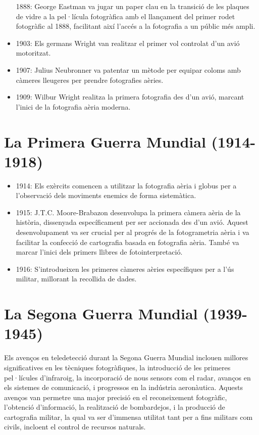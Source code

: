 \documentclass[
]{book}
\providecommand{\tightlist}{%
  \setlength{\itemsep}{0pt}\setlength{\parskip}{0pt}}
\begin{document}
\begin{itemize}
  1888: George Eastman va jugar un paper clau en la transició de les plaques de vidre a la pel·lícula fotogràfica amb el llançament del primer rodet fotogràfic al 1888, facilitant així l'accés a la fotografia a un públic més ampli.
\item
  1903: Els germans Wright van realitzar el primer vol controlat d'un avió motoritzat.
\item
  1907: Julius Neubronner va patentar un mètode per equipar coloms amb càmeres lleugeres per prendre fotografies aèries.
\item
  1909: Wilbur Wright realitza la primera fotografia des d'un avió, marcant l'inici de la fotografia aèria moderna.
\end{itemize}

\hypertarget{la-primera-guerra-mundial-1914-1918}{%
\section{La Primera Guerra Mundial (1914-1918)}\label{la-primera-guerra-mundial-1914-1918}}

\begin{itemize}
\tightlist
\item
  1914: Els exèrcits comencen a utilitzar la fotografia aèria i globus per a l'observació dels moviments enemics de forma sistemàtica.
\item
  1915: J.T.C. Moore-Brabazon desenvolupa la primera càmera aèria de la història, dissenyada específicament per ser accionada des d'un avió. Aquest desenvolupament va ser crucial per al progrés de la fotogrametria aèria i va facilitar la confecció de cartografia basada en fotografia aèria. També va marcar l'inici dels primers llibres de fotointerpretació.
\item
  1916: S'introdueixen les primeres càmeres aèries específiques per a l'ús militar, millorant la recollida de dades.
\end{itemize}

\hypertarget{la-segona-guerra-mundial-1939-1945}{%
\section{La Segona Guerra Mundial (1939-1945)}\label{la-segona-guerra-mundial-1939-1945}}

Els avenços en teledetecció durant la Segona Guerra Mundial inclouen millores significatives en les tècniques fotogràfiques, la introducció de les primeres pel·lícules d'infraroig, la incorporació de nous sensors com el radar, avanços en els sistemes de comunicació, i progressos en la indústria aeronàutica. Aquests avenços van permetre una major precisió en el reconeixement fotogràfic, l'obtenció d'informació, la realització de bombardejos, i la producció de cartografia militar, la qual va ser d'immensa utilitat tant per a fins militars com civils, incloent el control de recursos naturals.
\end{document}
